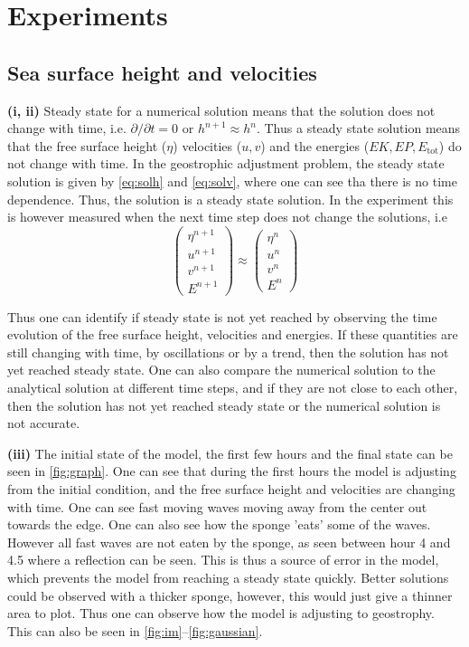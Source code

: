 \section{Experiments}
\subsection{Sea surface height and velocities}

\textbf{(i, ii)} Steady state for a numerical solution means that the solution does not change with time, i.e. $\partial/\partial t = 0$ or $h^{n+1}\approx h^n$. Thus a steady state solution means that the free surface height ($\eta$) velocities ($u,v$) and the energies ($EK, EP, E_\text{tot}$) do not change with time. In the geostrophic adjustment problem, the steady state solution is given by \autoref{eq:solh} and \autoref{eq:solv}, where one can see tha there is no time dependence. Thus, the solution is a steady state solution. In the experiment this is however measured when the next time step does not change the solutions, i.e 
\[
\begin{pmatrix}
\eta^{n+1} \\
u^{n+1} \\
v^{n+1} \\
E^{n+1}
\end{pmatrix}
\approx
\begin{pmatrix}
\eta^{n} \\
u^{n} \\
v^{n} \\
E^{n}
\end{pmatrix}
\]

Thus one can identify if steady state is not yet reached by observing the time evolution of the free surface height, velocities and energies. If these quantities are still changing with time, by oscillations or by a trend, then the solution has not yet reached steady state. One can also compare the numerical solution to the analytical solution at different time steps, and if they are not close to each other, then the solution has not yet reached steady state or the numerical solution is not accurate.

\textbf{(iii)} The initial state of the model, the first few hours and the final state can be seen in \autoref{fig:graph}. One can see that during the first hours the model is adjusting from the initial condition, and the free surface height and velocities are changing with time. One can see fast moving waves moving away from the center out towards the edge. One can also see how the sponge 'eats' some of the waves. However all fast waves are not eaten by the sponge, as seen between hour 4 and 4.5 where a reflection can be seen. This is thus a source of error in the model, which prevents the model from reaching a steady state quickly. Better solutions could be observed with a thicker sponge, however, this would just give a thinner area to plot. Thus one can observe how the model is adjusting to geostrophy. This can also be seen in \autoref{fig:im}--\ref{fig:gaussian}.

